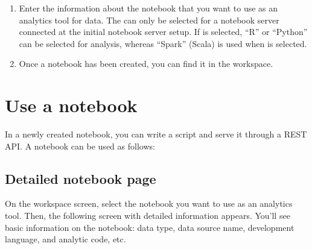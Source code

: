 \documentclass[letterpaper,10pt,english]{sphinxmanual}
\begin{document}
\begin{enumerate}
\item {} 
Enter the information about the notebook that you want to use as an analytics tool for data. The  can only be selected for a notebook server connected at the initial notebook server setup. If  is selected, “R” or “Python” can be selected for analysis, whereas “Spark” (Scala) is used when  is selected.
\begin{quote}

\begin{figure}[H]
\centering

\noindent{}
\end{figure}
\end{quote}

\item {} 
Once a notebook has been created, you can find it in the workspace.
\begin{quote}

\begin{figure}[H]
\centering

\noindent{}
\end{figure}
\end{quote}

\end{enumerate}


\section{Use a notebook}
\label{\detokenize{discovery/part05/use_a_notebook:id1}}\label{\detokenize{discovery/part05/use_a_notebook::doc}}
In a newly created notebook, you can write a script and serve it through a REST API. A notebook can be used as follows:


\subsection{Detailed notebook page}
\label{\detokenize{discovery/part05/use_a_notebook:id2}}
On the workspace screen, select the notebook you want to use as an analytics tool. Then, the following screen with detailed information appears. You’ll see basic information on the notebook: data type, data source name, development language, and analytic code, etc.
\begin{quote}

\begin{figure}[H]
\centering

\noindent{}
\end{figure}
\end{quote}
\end{document}
